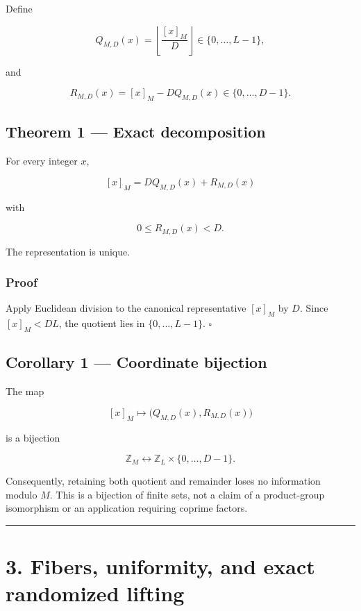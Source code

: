 \documentclass[11pt,a4paper]{article}
\begin{document}
Define

\[
Q_{M,D}(x)=\left\lfloor\frac{[x]_M}{D}\right\rfloor
\in\{0,\ldots,L-1\},
\]

and

\[
R_{M,D}(x)=[x]_M-DQ_{M,D}(x)
\in\{0,\ldots,D-1\}.
\]

\subsection{Theorem 1 --- Exact decomposition}\label{theorem-1-exact-decomposition}

For every integer \(x\),

\[
\boxed{
[x]_M=DQ_{M,D}(x)+R_{M,D}(x)
}
\]

with

\[
0\le R_{M,D}(x)<D.
\]

The representation is unique.

\subsubsection{Proof}\label{proof}

Apply Euclidean division to the canonical representative \([x]_M\) by \(D\). Since \([x]_M<DL\), the quotient lies in \(\{0,\ldots,L-1\}\). \(\square\)

\subsection{Corollary 1 --- Coordinate bijection}\label{corollary-1-coordinate-bijection}

The map

\[
[x]_M\longmapsto
\bigl(Q_{M,D}(x),R_{M,D}(x)\bigr)
\]

is a bijection

\[
\mathbb Z_M
\longleftrightarrow
\mathbb Z_L\times\{0,\ldots,D-1\}.
\]

Consequently, retaining both quotient and remainder loses no information modulo \(M\). This is a bijection of finite sets, not a claim of a product-group isomorphism or an application requiring coprime factors.

\begin{center}\rule{0.5\linewidth}{0.5pt}\end{center}

\section{3. Fibers, uniformity, and exact randomized lifting}\label{fibers-uniformity-and-exact-randomized-lifting}
\end{document}
